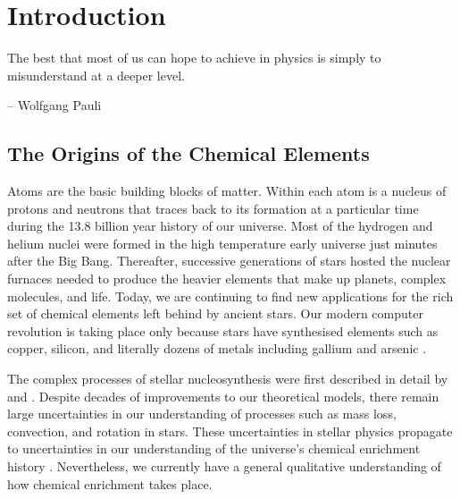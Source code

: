 \chapter{Introduction}\label{chap:introduction}

\epigraph{The best that most of us can hope to achieve in physics is simply to misunderstand at a deeper level.}{-- Wolfgang Pauli\footnotemark}


\section{The Origins of the Chemical Elements}
Atoms are the basic building blocks of matter. Within each atom is a nucleus of protons and neutrons that traces back to its formation at a particular time during the 13.8 billion year history of our universe. Most of the hydrogen and helium nuclei were formed in the high temperature early universe just minutes after the Big Bang. Thereafter, successive generations of stars hosted the nuclear furnaces needed to produce the heavier elements that make up planets, complex molecules, and life. Today, we are continuing to find new applications for the rich set of chemical elements left behind by ancient stars. Our modern computer revolution is taking place only because stars have synthesised elements such as copper, silicon, and literally dozens of metals including gallium and arsenic \citep{Eggert:2008ux}.

The complex processes of stellar nucleosynthesis were first described in detail by \citet{Burbidge:1957hf} and \citet{Cameron:1957jd}. Despite decades of improvements to our theoretical models, there remain large uncertainties in our understanding of processes such as mass loss, convection, and rotation in stars. These uncertainties in stellar physics propagate to uncertainties in our understanding of the universe's chemical enrichment history \citep[see e.g.,][]{Romano:2010hf}. Nevertheless, we currently have a general qualitative understanding of how chemical enrichment takes place.

